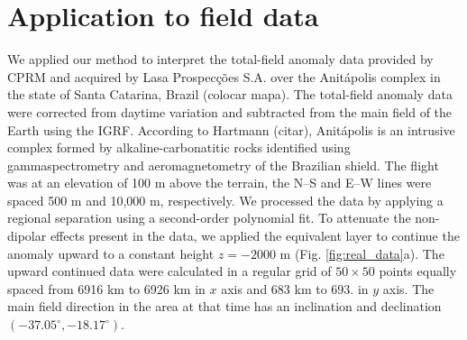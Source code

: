 \section{Application to field data}

We applied our method to interpret the total-field anomaly data provided by CPRM and acquired by Lasa Prospecções S.A. over the Anitápolis complex in the state of Santa Catarina, Brazil (colocar mapa). The total-field anomaly data were corrected from daytime variation and subtracted from the main field of the Earth using the IGRF. According to Hartmann (citar), Anitápolis is an intrusive complex formed by alkaline-carbonatitic rocks identified using gammaspectrometry and aeromagnetometry of the Brazilian shield. The flight was at an elevation of 100 m above the terrain, the N–S and E–W lines were spaced 500 m and 10,000 m, respectively. We processed the data by applying a regional separation using a second-order polynomial fit. To attenuate the non-dipolar effects present in the data, we applied the equivalent layer to continue the anomaly upward to a constant height $z=-2000$ m (Fig. \ref{fig:real_data}a). The upward continued data were calculated in a regular grid of $50\times50$ points equally spaced from 6916 km to 6926 km in $x$ axis and 683 km to 693. in $y$ axis. The main field direction in the area at that time has an inclination and declination $(-37.05^\circ, -18.17^\circ)$.

